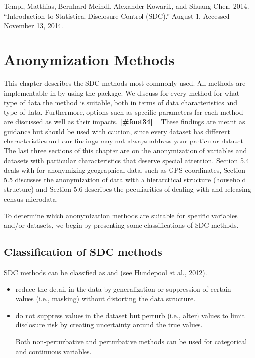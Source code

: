 \documentclass[letterpaper,10pt,english]{sphinxmanual}
\begin{document}
Templ, Matthias, Bernhard Meindl, Alexander Kowarik, and Shuang Chen.
2014. “Introduction to Statistical Disclosure Control (SDC).”
August 1. Accessed November 13, 2014.


\chapter{Anonymization Methods}
\label{\detokenize{anon_methods::doc}}\label{\detokenize{anon_methods:anonymization-methods}}
This chapter describes the SDC methods most commonly used. All methods
are implementable in  by using the  package. We discuss for
every method for what type of data the method is suitable, both in terms
of data characteristics and type of data. Furthermore, options such as
specific parameters for each method are discussed as well as their
impacts. {\color{red}\bfseries{}{[}\#foot34{]}\_} These findings are meant as guidance but
should be used with caution, since every dataset has different
characteristics and our findings may not always address your particular
dataset. The last three sections of this chapter are on the
anonymization of variables and datasets with particular characteristics
that deserve special attention. Section 5.4 deals with for anonymizing
geographical data, such as GPS coordinates, Section 5.5 discusses the
anonymization of data with a hierarchical structure (household
structure) and Section 5.6 describes the peculiarities of dealing with
and releasing census microdata.

To determine which anonymization methods are suitable for specific
variables and/or datasets, we begin by presenting some classifications
of SDC methods.


\section{Classification of SDC methods}
\label{\detokenize{anon_methods:classification-of-sdc-methods}}
SDC methods can be classified as  and
 (see Hundepool et al., 2012).
\begin{itemize}
\item {} 
 reduce the detail in the data by
generalization or suppression of certain values (i.e., masking)
without distorting the data structure.

\item {} 
 do not suppress values in the dataset but
perturb (i.e., alter) values to limit disclosure risk by creating
uncertainty around the true values.

Both non-perturbative and perturbative methods can be used for
categorical and continuous variables.

\end{itemize}
\end{document}
